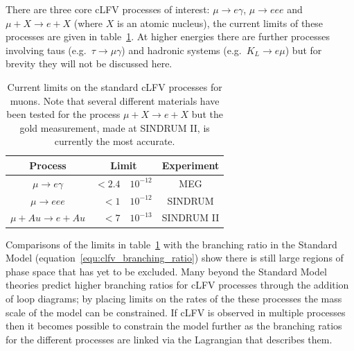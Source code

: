 There are three core cLFV processes of interest: \( \mu\rightarrow e\gamma \), \( \mu\rightarrow eee \) and  \(\mu+X\rightarrow e+X \) (where \(X\) is an atomic nucleus), the current limits of these processes are given in table~\ref{tab:clfv}. At higher energies there are further processes involving taus (e.g.\ \(\tau\rightarrow\mu\gamma\)) and hadronic systems (e.g.\ \(K_L\rightarrow e\mu\)) but for brevity they will not be discussed here. 
\begin{table}
  \begin{center}
  \begin{tabular}{c | r@{\( \times \)}l | c}
    Process                  &  \multicolumn{2}{c|}{Limit}  &  Experiment \\
    \hline
    \(\mu\rightarrow e\gamma\)  &  \(<2.4\) & \(10^{-12}\)  &  MEG        \\
    \(\mu\rightarrow eee\)      &    \(<1\) & \(10^{-12}\)  &  SINDRUM    \\
    \(\mu+Au\rightarrow e+Au\)  &    \(<7\) & \(10^{-13}\)  &  SINDRUM II \\
    
  \end{tabular}
  \end{center}
  \caption{Current limits on the standard cLFV processes for muons. Note that several different materials have been tested for the process \( \mu + X\rightarrow e + X \) but the gold measurement, made at SINDRUM II, is currently the most accurate.}
  \label{tab:clfv}
\end{table}

Comparisons of the limits in table~\ref{tab:clfv} with the branching ratio in the Standard Model (equation~\eqref{equ:clfv_branching_ratio}) show there is still large regions of phase space that has yet to be excluded. Many beyond the Standard Model theories predict higher branching ratios for cLFV processes through the addition of loop diagrams; by placing limits on the rates of the these processes the mass scale of the model can be constrained. If cLFV is observed in multiple processes then it becomes possible to constrain the model further as the branching ratios for the different processes are linked via the Lagrangian that describes them.

